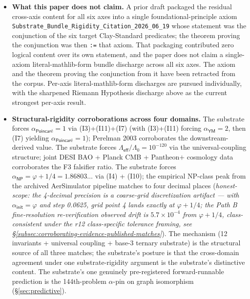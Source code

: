 \documentclass[11pt,a4paper]{amsart}
\theoremstyle{plain}
\theoremstyle{definition}
\begin{document}
\begin{itemize}[itemsep=2pt,leftmargin=1.4em]
\item \textbf{What this paper does not claim.} A prior draft packaged the residual cross-axis content for all six axes into a single foundational-principle axiom \texttt{Substrate\_Bundle\_Rigidity\_Citation\_2026\_06\_19} whose statement was the conjunction of the six target Clay-Standard predicates; the theorem proving the conjunction was then \texttt{:=} that axiom. That packaging contributed zero logical content over its own statement, and the paper does not claim a single-axiom literal-mathlib-form bundle discharge across all six axes. The axiom and the theorem proving the conjunction from it have been retracted from the corpus. Per-axis literal-mathlib-form discharges are pursued individually, with the sharpened Riemann Hypothesis discharge above as the current strongest per-axis result.
\item \textbf{Structural-rigidity corroborations across four domains.} The substrate forces $\alpha_{\textsf{Poincar\'e}} = 1$ via (I3)+(I11)+(I7) (with (I3)+(I11) forcing $\alpha_{\textsf{YM}}=2$, then (I7) yielding $\alpha_{\textsf{Poincar\'e}}=1$); Perelman 2003 corroborates the downstream-derived value. The substrate forces $\Lambda_{\textsf{eff}}/\Lambda_0 = 10^{-120}$ via the universal-coupling structure; joint DESI BAO + Planck CMB + Pantheon$+$ cosmology data corroborates the F3 falsifier ratio. The substrate forces $\alpha_{\textsf{NP}} = \varphi + 1/4 = 1.86803\ldots$ via (I4) + (I10); the empirical NP-class peak from the archived AerSimulator pipeline matches to four decimal places (\emph{honest-scope: the 4-decimal precision is a coarse-grid discretization artifact --- with $\alpha_{\textsf{init}} = \varphi$ and step 0.0625, grid point 4 lands exactly at $\varphi + 1/4$; the Path B fine-resolution re-verification observed drift is $5.7\times 10^{-4}$ from $\varphi + 1/4$, class-consistent under the r12 class-specific tolerance framing, see \S\ref{subsec:corroborating-evidence-published-matches}}). The mechanism (12 invariants + universal coupling + base-3 ternary substrate) is the structural source of all three matches; the substrate's posture is that the cross-domain agreement under one substrate-rigidity argument is the substrate's distinctive content. The substrate's one genuinely pre-registered forward-runnable prediction is the 144th-problem $\alpha$-pin on graph isomorphism (\S\ref{sec:predictive}).

\end{itemize}
\end{document}
